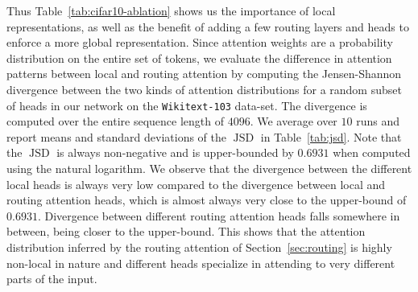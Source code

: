\documentclass[a4paper]{article}
\begin{document}
Thus Table~\ref{tab:cifar10-ablation} shows us the importance of local representations,
as well as the benefit of adding a few routing layers and heads to enforce
a more global representation. Since attention weights are a probability distribution on
the entire set of tokens, we evaluate the difference in attention patterns between local and
routing attention by computing the Jensen-Shannon divergence between 
the two kinds of attention distributions for a random subset of heads 
in our network on the \texttt{Wikitext-103} data-set.
The divergence is computed over the entire sequence length of \(4096\).
We average over \(10\) runs and report means and standard deviations of the \(\operatorname{JSD}\) in Table~\ref{tab:jsd}. 
Note that the \(\operatorname{JSD}\) is always non-negative and is upper-bounded by \(0.6931\)
when computed using the natural logarithm.
We observe that the divergence between the different
local heads is always very low compared
to the divergence between local and routing attention heads, 
which is almost always very close to the upper-bound
of \(0.6931\). 
Divergence between different routing attention heads falls somewhere in
between, being closer to the upper-bound.
This shows that the attention distribution inferred 
by the routing attention of Section~\ref{sec:routing}
is highly non-local in nature and 
different heads specialize in attending to very different parts 
of the input.
\end{document}
